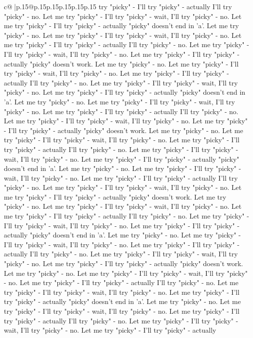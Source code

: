 \documentclass{article}
\begin{document}
{\begin{supertabular}{c@{$\;$}|p{.15\linewidth}@{}p{.15\linewidth}p{.15\linewidth}p{.15\linewidth}p{.15\linewidth}p{.15\linewidth}}
{{{try "picky" {-} I'll try "picky" {-} actually I'll try "picky" {-} no. Let me try "picky" {-} I'll try "picky" {-} wait, I'll try "picky" {-} no. Let me try "picky" {-} I'll try "picky" {-} actually "picky" doesn't end in 'a'. Let me try "picky" {-} no. Let me try "picky" {-} I'll try "picky" {-} wait, I'll try "picky" {-} no. Let me try "picky" {-} I'll try "picky" {-} actually I'll try "picky" {-} no. Let me try "picky" {-} I'll try "picky" {-} wait, I'll try "picky" {-} no. Let me try "picky" {-} I'll try "picky" {-} actually "picky" doesn't work. Let me try "picky" {-} no. Let me try "picky" {-} I'll try "picky" {-} wait, I'll try "picky" {-} no. Let me try "picky" {-} I'll try "picky" {-} actually I'll try "picky" {-} no. Let me try "picky" {-} I'll try "picky" {-} wait, I'll try "picky" {-} no. Let me try "picky" {-} I'll try "picky" {-} actually "picky" doesn't end in 'a'. Let me try "picky" {-} no. Let me try "picky" {-} I'll try "picky" {-} wait, I'll try "picky" {-} no. Let me try "picky" {-} I'll try "picky" {-} actually I'll try "picky" {-} no. Let me try "picky" {-} I'll try "picky" {-} wait, I'll try "picky" {-} no. Let me try "picky" {-} I'll try "picky" {-} actually "picky" doesn't work. Let me try "picky" {-} no. Let me try "picky" {-} I'll try "picky" {-} wait, I'll try "picky" {-} no. Let me try "picky" {-} I'll try "picky" {-} actually I'll try "picky" {-} no. Let me try "picky" {-} I'll try "picky" {-} wait, I'll try "picky" {-} no. Let me try "picky" {-} I'll try "picky" {-} actually "picky" doesn't end in 'a'. Let me try "picky" {-} no. Let me try "picky" {-} I'll try "picky" {-} wait, I'll try "picky" {-} no. Let me try "picky" {-} I'll try "picky" {-} actually I'll try "picky" {-} no. Let me try "picky" {-} I'll try "picky" {-} wait, I'll try "picky" {-} no. Let me try "picky" {-} I'll try "picky" {-} actually "picky" doesn't work. Let me try "picky" {-} no. Let me try "picky" {-} I'll try "picky" {-} wait, I'll try "picky" {-} no. Let me try "picky" {-} I'll try "picky" {-} actually I'll try "picky" {-} no. Let me try "picky" {-} I'll try "picky" {-} wait, I'll try "picky" {-} no. Let me try "picky" {-} I'll try "picky" {-} actually "picky" doesn't end in 'a'. Let me try "picky" {-} no. Let me try "picky" {-} I'll try "picky" {-} wait, I'll try "picky" {-} no. Let me try "picky" {-} I'll try "picky" {-} actually I'll try "picky" {-} no. Let me try "picky" {-} I'll try "picky" {-} wait, I'll try "picky" {-} no. Let me try "picky" {-} I'll try "picky" {-} actually "picky" doesn't work. Let me try "picky" {-} no. Let me try "picky" {-} I'll try "picky" {-} wait, I'll try "picky" {-} no. Let me try "picky" {-} I'll try "picky" {-} actually I'll try "picky" {-} no. Let me try "picky" {-} I'll try "picky" {-} wait, I'll try "picky" {-} no. Let me try "picky" {-} I'll try "picky" {-} actually "picky" doesn't end in 'a'. Let me try "picky" {-} no. Let me try "picky" {-} I'll try "picky" {-} wait, I'll try "picky" {-} no. Let me try "picky" {-} I'll try "picky" {-} actually I'll try "picky" {-} no. Let me try "picky" {-} I'll try "picky" {-} wait, I'll try "picky" {-} no. Let me try "picky" {-} I'll try "picky" {-} actually }}}
\end{supertabular}}
\end{document}

